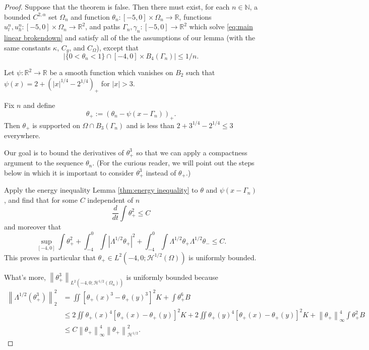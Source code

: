\documentclass[11pt]{amsart}
\theoremstyle{remark}
\theoremstyle{definition}
\newcommand{\R}{\mathbb{R}}
\newcommand{\N}{\mathbb{N}}
\newcommand{\norm}[1]{\left\lVert#1\right\rVert}
\newcommand{\paren}[1]{\left( #1 \right)}
\newcommand{\abs}[1]{\left\lvert #1 \right\rvert}
\newcommand{\ddt}{\frac{d}{dt}}
\newcommand{\ulow}{u_l}
\newcommand{\uhigh}{u_h}
\newcommand{\HD}{\mathcal{H}}
\newcommand{\Cgamma}{C_g}
\newcommand{\Comega}{C_\Omega}
\newcounter{step_count}[section]
\begin{document}
\begin{proof}
Suppose that the theorem is false.  Then there must exist, for each $n \in \N$, a bounded $C^{2,\alpha}$ set $\Omega_n$ and function $\theta_n: [-5,0]\times \Omega_n \to \R$, functions $\ulow^n, \uhigh^n: [-5,0]\times\Omega_n \to \R^2$, and paths $\Gamma_n,\gamma_n:[-5,0]\to\R^2$ which solve \eqref{eq:main linear brokendown} and satisfy all of the the assumptions of our lemma (with the same constants $\kappa$, $\Cgamma$, and $\Comega$), except that
\begin{equation} \label{mass assumption between} \abs{\{0 < \theta_n < 1\} \cap [-4,0]\times B_4(\Gamma_n)} \leq 1/n. \end{equation}

Let $\psi:\R^2 \to \R$ be a smooth function which vanishes on $B_2$ such that $\psi(x) = 2 + \paren{|x|^{1/4}-2^{1/4}}_+$ for $|x|>3$.  

Fix $n$ and define 
\[ \theta_+ := \paren{\theta_n - \psi(x-\Gamma_n)}_+. \]
Then $\theta_+$ is supported on $\Omega \cap B_3(\Gamma_n)$ and is less than $2 + 3^{1/4} - 2^{1/4} \leq 3$ everywhere.  

Our goal is to bound the derivatives of $\theta_+^3$ so that we can apply a compactness argument to the sequence $\theta_n$.  (For the curious reader, we will point out the steps below in which it is important to consider $\theta_+^3$ instead of $\theta_+$.)  

Apply the energy inequality Lemma \ref{thm:energy inequality} to $\theta$ and $\psi(x-\Gamma_n)$, and find that for some $C$ independent of $n$
\begin{equation} \label{ddt theta bounded} \ddt \int \theta_+^2 \leq C \end{equation}
and moreover that
\begin{equation}\label{DG2 energy} \sup_{[-4,0]} \int \theta_+^2 + \int_{-4}^0 \int \abs{\Lambda^{1/2}\theta_+}^2 + \int_{-4}^0 \int \Lambda^{1/2}\theta_+ \Lambda^{1/2}\theta_- \leq C. \end{equation}
This proves in particular that $\theta_+ \in L^2(-4,0; \HD^{1/2}(\Omega))$ is uniformly bounded.  

What's more, $\norm{\theta_+^3}_{L^2(-4,0;\HD^{1/2}(\Omega_n))}$ is uniformly bounded because
\begin{align*} 
\norm{\Lambda^{1/2}(\theta_+^3)}_2^2 &= \iint [\theta_+(x)^3 - \theta_+(y)^3]^2 K + \int \theta_+^6 B 
\\ &\leq 2\iint \theta_+(x)^4 [\theta_+(x)-\theta_+(y)]^2 K + 2\iint \theta_+(y)^4[\theta_+(x)-\theta_+(y)]^2 K + \norm{\theta_+}_\infty^4 \int \theta_+^2 B
\\ &\leq C \norm{\theta_+}_\infty^4 \norm{\theta_+}_{\HD^{1/2}}^2.  
\end{align*}


\end{proof}
\end{document}
